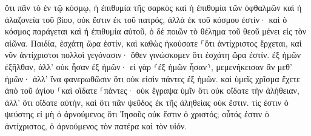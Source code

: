 \documentclass{openreader}
\begin{document}
ὅτι πᾶν τὸ ἐν τῷ κόσμῳ, ἡ ἐπιθυμία τῆς σαρκὸς καὶ ἡ ἐπιθυμία τῶν ὀφθαλμῶν καὶ ἡ ἀλαζονεία τοῦ βίου, οὐκ ἔστιν ἐκ τοῦ πατρός, ἀλλὰ ἐκ τοῦ κόσμου ἐστίν· 
καὶ ὁ κόσμος παράγεται καὶ ἡ ἐπιθυμία αὐτοῦ, ὁ δὲ ποιῶν τὸ θέλημα τοῦ θεοῦ μένει εἰς τὸν αἰῶνα. 
Παιδία, ἐσχάτη ὥρα ἐστίν, καὶ καθὼς ἠκούσατε ⸀ὅτι ἀντίχριστος ἔρχεται, καὶ νῦν ἀντίχριστοι πολλοὶ γεγόνασιν· ὅθεν γινώσκομεν ὅτι ἐσχάτη ὥρα ἐστίν. 
ἐξ ἡμῶν ἐξῆλθαν, ἀλλ’ οὐκ ἦσαν ἐξ ἡμῶν· εἰ γὰρ ⸂ἐξ ἡμῶν ἦσαν⸃, μεμενήκεισαν ἂν μεθ’ ἡμῶν· ἀλλ’ ἵνα φανερωθῶσιν ὅτι οὐκ εἰσὶν πάντες ἐξ ἡμῶν. 
καὶ ὑμεῖς χρῖσμα ἔχετε ἀπὸ τοῦ ἁγίου ⸀καὶ οἴδατε ⸀πάντες· 
οὐκ ἔγραψα ὑμῖν ὅτι οὐκ οἴδατε τὴν ἀλήθειαν, ἀλλ’ ὅτι οἴδατε αὐτήν, καὶ ὅτι πᾶν ψεῦδος ἐκ τῆς ἀληθείας οὐκ ἔστιν. 
τίς ἐστιν ὁ ψεύστης εἰ μὴ ὁ ἀρνούμενος ὅτι Ἰησοῦς οὐκ ἔστιν ὁ χριστός; οὗτός ἐστιν ὁ ἀντίχριστος, ὁ ἀρνούμενος τὸν πατέρα καὶ τὸν υἱόν. 
\end{document}
